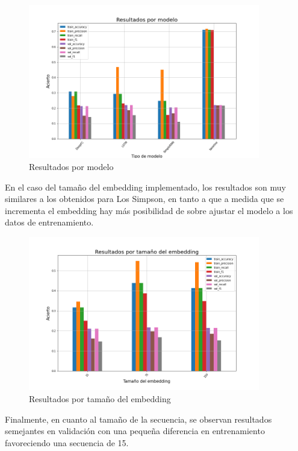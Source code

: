 \begin{figure}[H]
    \centering
    \includegraphics[width=0.9\textwidth]{results/friends/deepModels/sim_res_deep_model.png}
    \caption{Resultados por modelo}
    \label{fig:fri_deep_model}
\end{figure}

En el caso del tamaño del embedding implementado, los resultados son muy similares a los obtenidos para Los Simpson, en tanto a que a medida que se incrementa el embedding hay más posibilidad de sobre ajustar el modelo a los datos de entrenamiento.\\

\begin{figure}[H]
    \centering
    \includegraphics[width=0.9\textwidth]{results/friends/deepModels/sim_res_deep_em_size.png}
    \caption{Resultados por tamaño del embedding}
    \label{fig:fri_deep_em_size}
\end{figure}

Finalmente, en cuanto al tamaño de la secuencia, se observan resultados semejantes en validación con una pequeña diferencia en entrenamiento favoreciendo una secuencia de 15.\\

